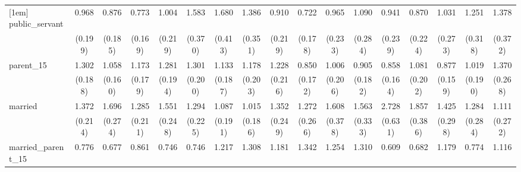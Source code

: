 {\begin{tabular}{l*{16}{c}}
[1em]
public\_servant      &       0.968         &       0.876         &       0.773         &       1.004         &       1.583\sym{*}  &       1.680\sym{*}  &       1.386         &       0.910         &       0.722         &       0.965         &       1.090         &       0.941         &       0.870         &       1.031         &       1.251         &       1.378         \\
                    &     (0.199)         &     (0.185)         &     (0.169)         &     (0.219)         &     (0.370)         &     (0.413)         &     (0.351)         &     (0.219)         &     (0.178)         &     (0.233)         &     (0.284)         &     (0.239)         &     (0.224)         &     (0.273)         &     (0.318)         &     (0.372)         \\
[1em]
parent\_15           &       1.302         &       1.058         &       1.173         &       1.281         &       1.301         &       1.133         &       1.178         &       1.228         &       0.850         &       1.006         &       0.905         &       0.858         &       1.081         &       0.877         &       1.019         &       1.370         \\
                    &     (0.188)         &     (0.160)         &     (0.179)         &     (0.194)         &     (0.200)         &     (0.187)         &     (0.203)         &     (0.216)         &     (0.172)         &     (0.206)         &     (0.182)         &     (0.164)         &     (0.202)         &     (0.159)         &     (0.190)         &     (0.268)         \\
[1em]
married             &       1.372\sym{*}  &       1.696\sym{**} &       1.285         &       1.551\sym{**} &       1.294         &       1.087         &       1.015         &       1.352         &       1.272         &       1.608\sym{*}  &       1.563\sym{*}  &       2.728\sym{***}&       1.857\sym{**} &       1.425         &       1.284         &       1.111         \\
                    &     (0.214)         &     (0.274)         &     (0.211)         &     (0.248)         &     (0.225)         &     (0.191)         &     (0.186)         &     (0.249)         &     (0.266)         &     (0.378)         &     (0.333)         &     (0.631)         &     (0.386)         &     (0.298)         &     (0.284)         &     (0.272)         \\
[1em]
married\_parent\_15   &       0.776         &       0.677         &       0.861         &       0.746         &       0.746         &       1.217         &       1.308         &       1.181         &       1.342         &       1.254         &       1.310         &       0.609         &       0.682         &       1.179         &       0.774         &       1.116         \\

\end{tabular}}
